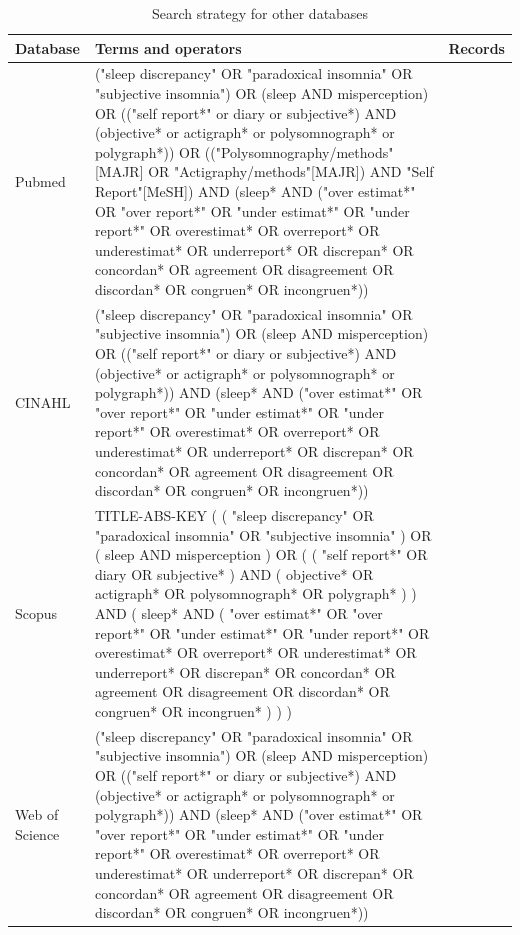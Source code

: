\documentclass[
]{article}
\begin{document}
\begin{table}[!h]
\centering
\caption{\label{tab:databases}Search strategy for other databases}
\centering
\fontsize{8}{10}\selectfont
\begin{tabular}[t]{>{\raggedright\arraybackslash}p{7em}>{\raggedright\arraybackslash}p{40em}>{\raggedleft\arraybackslash}p{4em}}
\toprule
Database & Terms and operators & Records\\
\midrule
Pubmed & ("sleep discrepancy" OR "paradoxical insomnia" OR "subjective insomnia") OR (sleep AND misperception) OR
(("self report*" or diary or subjective*) AND (objective* or actigraph* or polysomnograph* or polygraph*)) OR (("Polysomnography/methods"[MAJR] OR "Actigraphy/methods"[MAJR]) AND "Self Report"[MeSH])
AND (sleep* AND ("over estimat*" OR "over report*" OR "under estimat*" OR "under report*" OR overestimat* OR overreport* OR underestimat* OR underreport* OR discrepan* OR concordan* OR agreement OR disagreement OR discordan* OR congruen* OR incongruen*)) & 761\\
CINAHL & ("sleep discrepancy" OR "paradoxical insomnia" OR "subjective insomnia") OR (sleep AND misperception) OR
(("self report*" or diary or subjective*) AND (objective* or actigraph* or polysomnograph* or polygraph*))
AND (sleep* AND ("over estimat*" OR "over report*" OR "under estimat*" OR "under report*" OR overestimat* OR overreport* OR underestimat* OR underreport* OR discrepan* OR concordan* OR agreement OR disagreement OR discordan* OR congruen* OR incongruen*)) & 310\\
Scopus & TITLE-ABS-KEY ( ( "sleep discrepancy"  OR  "paradoxical insomnia"  OR  "subjective insomnia" )  OR  ( sleep  AND  misperception )  OR  ( ( "self report*"  OR  diary  OR  subjective* )  AND  ( objective*  OR  actigraph*  OR  polysomnograph*  OR  polygraph* ) )  AND  ( sleep*  AND  ( "over estimat*"  OR  "over report*"  OR  "under estimat*"  OR  "under report*"  OR  overestimat*  OR  overreport*  OR  underestimat*  OR  underreport*  OR  discrepan*  OR  concordan*  OR  agreement  OR  disagreement  OR  discordan*  OR  congruen*  OR  incongruen* ) ) ) & 826\\
Web of Science & ("sleep discrepancy" OR "paradoxical insomnia" OR "subjective insomnia") OR (sleep AND misperception) OR
(("self report*" or diary or subjective*) AND (objective* or actigraph* or polysomnograph* or polygraph*))
AND (sleep* AND ("over estimat*" OR "over report*" OR "under estimat*" OR "under report*" OR overestimat* OR overreport* OR underestimat* OR underreport* OR discrepan* OR concordan* OR agreement OR disagreement OR discordan* OR congruen* OR incongruen*)) & 1288\\

\end{tabular}
\end{table}
\end{document}
